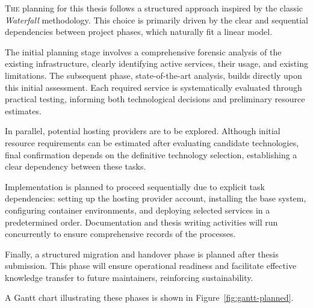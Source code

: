 \lettrine{T}{he} planning for this thesis follows a structured approach inspired by the classic \emph{Waterfall} methodology. This choice is primarily driven by the clear and sequential dependencies between project phases, which naturally fit a linear model.

The initial planning stage involves a comprehensive forensic analysis of the existing infrastructure, clearly identifying active services, their usage, and existing limitations. The subsequent phase, state-of-the-art analysis, builds directly upon this initial assessment. Each required service is systematically evaluated through practical testing, informing both technological decisions and preliminary resource estimates.

In parallel, potential hosting providers are to be explored. Although initial resource requirements can be estimated after evaluating candidate technologies, final confirmation depends on the definitive technology selection, establishing a clear dependency between these tasks.

Implementation is planned to proceed sequentially due to explicit task dependencies: setting up the hosting provider account, installing the base system, configuring container environments, and deploying selected services in a predetermined order. Documentation and thesis writing activities will run concurrently to ensure comprehensive records of the processes.

Finally, a structured migration and handover phase is planned after thesis submission. This phase will ensure operational readiness and facilitate effective knowledge transfer to future maintainers, reinforcing sustainability.

A Gantt chart illustrating these phases is shown in Figure~\ref{fig:gantt-planned}.

